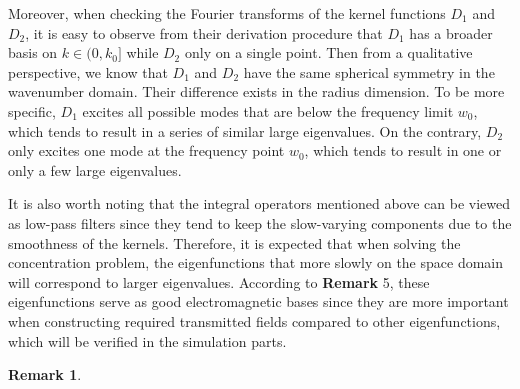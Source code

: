 \documentclass[a4paper,12pt]{article}
\newtheorem{remark}{\bf Remark}
\begin{document}
\begin{framed}
{   \quad Moreover, when checking the Fourier transforms of the kernel functions $D_1$ and $D_2$, it is easy to observe from their derivation procedure that $D_1$ has a broader basis on $k \in (0,k_0]$ while $D_2$ only on a single point. Then from a qualitative perspective, we know that $D_1$ and $D_2$ have the same spherical symmetry in the wavenumber domain. Their difference exists in the radius dimension. To be more specific,
   $D_1$ excites all possible modes that are below the frequency limit $w_0$, which tends to result in a series of similar large eigenvalues. On the contrary, $D_2$ only excites one mode at the frequency point $w_0$, which tends to result in one or only a few large eigenvalues. 
   
   \quad It is also worth noting that the integral operators mentioned above can be viewed as low-pass filters since they tend to keep the slow-varying components due to the smoothness of the kernels. Therefore, it is expected that when solving the concentration problem, the eigenfunctions that more slowly on the space domain will correspond to larger eigenvalues. According to {\bf Remark} 5, these eigenfunctions serve as good electromagnetic bases since they are more important when constructing required transmitted fields compared to other eigenfunctions, which will be verified in the simulation parts.
   }
   
   {
   \color{red}
   \setcounter{remark}{5} 
   \begin{remark}
   	

\end{remark}}
\end{framed}
\end{document}

